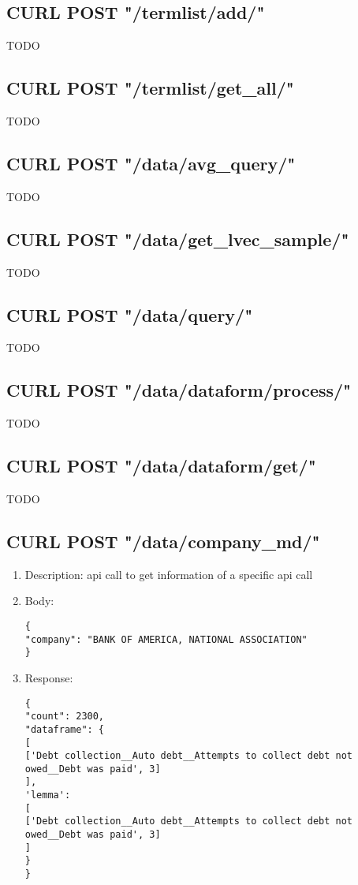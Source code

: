 \documentclass{article}
\begin{document}
\subsection{CURL POST "/termlist/add/"}
TODO

\subsection{CURL POST "/termlist/get_all/"}
TODO

\subsection{CURL POST "/data/avg_query/"}
TODO

\subsection{CURL POST "/data/get_lvec_sample/"}
TODO

\subsection{CURL POST "/data/query/"}
TODO

\subsection{CURL POST "/data/dataform/process/"}
TODO

\subsection{CURL POST "/data/dataform/get/"}
TODO

\subsection{CURL POST "/data/company_md/"}
\begin{enumerate}
\item Description: api call to get information of a specific api call
\item Body: 
\begin{lstlisting}
{ 
"company": "BANK OF AMERICA, NATIONAL ASSOCIATION"
}
\end{lstlisting}
\item Response:
\begin{lstlisting}
{ 
"count": 2300,
"dataframe": {
[
['Debt collection__Auto debt__Attempts to collect debt not owed__Debt was paid', 3]
], 
'lemma': 
[
['Debt collection__Auto debt__Attempts to collect debt not owed__Debt was paid', 3] 
]	
}
}
\end{lstlisting}
\end{enumerate}
\end{document}
